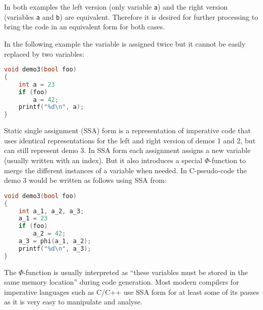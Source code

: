 In both examples the left version (only variable \lstinline[language=C++]{a}) and the right version (variables
\lstinline[language=Verilog]{a} and \lstinline[language=Verilog]{b}) are equivalent. Therefore it is
desired for further processing to bring the code in an equivalent form for both cases.

In the following example the variable is assigned twice but it cannot be easily replaced by two variables:

\begin{lstlisting}[frame=single,language=C++]
void demo3(bool foo)
{
	int a = 23
	if (foo)
		a = 42;
	printf("%d\n", a);
}
\end{lstlisting}

Static single assignment (SSA) form is a representation of imperative code that uses identical representations
for the left and right version of demos 1 and 2, but can still represent demo 3. In SSA form each assignment
assigns a new variable (usually written with an index). But it also introduces a special $\Phi$-function to
merge the different instances of a variable when needed. In C-pseudo-code the demo 3 would be written as follows
using SSA from:

\begin{lstlisting}[frame=single,language=C++]
void demo3(bool foo)
{
	int a_1, a_2, a_3;
	a_1 = 23
	if (foo)
		a_2 = 42;
	a_3 = phi(a_1, a_2);
	printf("%d\n", a_3);
}
\end{lstlisting}

The $\Phi$-function is usually interpreted as ``these variables must be stored
in the same memory location'' during code generation. Most modern compilers for imperative languages
such as C/C++ use SSA form for at least some of its passes as it is very easy to manipulate and analyse.
\fi

